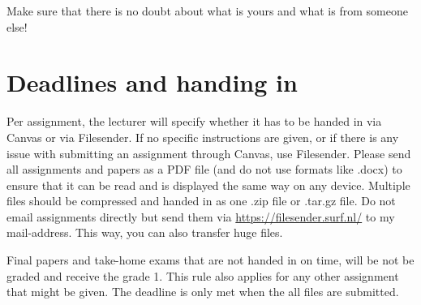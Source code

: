 \documentclass[a4paper,10pt,twocolumn]{report}
\begin{document}
Make sure that there is no doubt about what is yours and what is from someone else!

\section{Deadlines and handing in}
Per assignment, the lecturer will specify whether it has to be handed in via Canvas or via Filesender. If no specific instructions are given, or if there is any issue with submitting an assignment through Canvas, use Filesender. Please send all assignments and papers as a PDF file (and do not use formats like .docx) to ensure that it can be read and is displayed the same way on any device. Multiple files should be compressed and handed in as one .zip file or .tar.gz file. Do not email assignments directly but send them via \url{https://filesender.surf.nl/} to my mail-address. This way, you can also transfer huge files.

Final papers and take-home exams that are not handed in on time, will be not be graded and receive the grade 1. This rule also applies for any other assignment that might be given. The deadline is only met when the all files are submitted.
\end{document}
